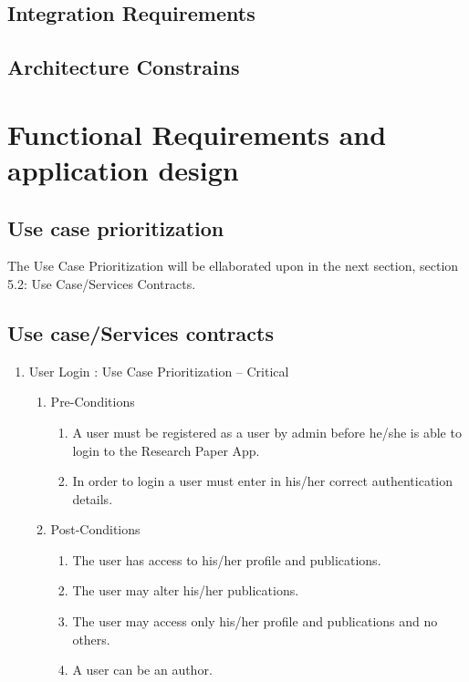 \documentclass[10pt,a4paper]{exam}
\begin{document}
\subsection{Integration Requirements}
\lipsum[4]
\subsection{Architecture Constrains}
\lipsum[5]

\section{Functional Requirements and application design}
\subsection{Use case prioritization}
The Use Case Prioritization will be ellaborated upon in the next section, section 5.2: Use Case/Services Contracts.
\subsection{ Use case/Services contracts}

\begin{enumerate}
\item  User Login : Use Case Prioritization -- Critical

\begin{enumerate}
\item  Pre-Conditions

\begin{enumerate}
\item  A user must be registered as a user by admin before he/she is able to login to the Research Paper App.

\item  In order to login a user must enter in his/her correct authentication details.
\end{enumerate}

\item  Post-Conditions

\begin{enumerate}
\item  The user has access to his/her profile and publications.

\item  The user may alter his/her publications.

\item  The user may access only his/her profile and publications and no others.

\item  A user can be an author.
\end{enumerate}
\end{enumerate}
\end{enumerate}
\end{document}
